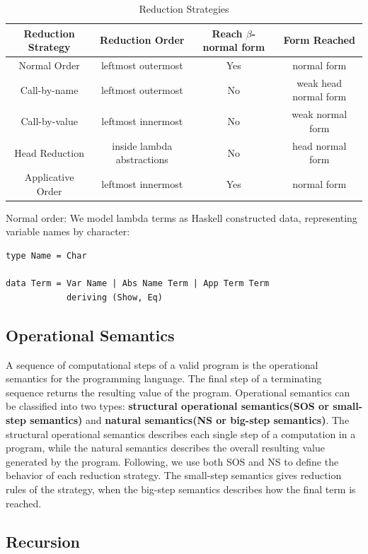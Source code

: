 \documentclass[a4paper,11pt,twoside]{report}
\begin{document}
\begin{center}
\begin{table}[ht!]
\begin{tabular}{|c|c|c|c|}\hline
Reduction Strategy & Reduction Order & Reach $\beta$-normal form & Form Reached\\ \hline
Normal Order & leftmost outermost & Yes & normal form\\ \hline
Call-by-name & leftmost outermost & No  & weak head normal form\\ \hline
Call-by-value & leftmost innermost & No & weak normal form\\ \hline
Head Reduction & inside lambda abstractions & No & head normal form\\ \hline
Applicative Order & leftmost innermost & Yes & normal form\\ \hline
\end{tabular}
\caption{Reduction Strategies}
\end{table}
\end{center}
Normal order:
We model lambda terms as Haskell constructed data, representing variable names by character:

\begin{verbatim}
type Name = Char  

data Term = Var Name | Abs Name Term | App Term Term
            deriving (Show, Eq)
\end{verbatim}


\subsection*{Operational Semantics}

A sequence of computational steps of a valid program is the operational semantics for the programming language. The final step of a terminating sequence returns the resulting value of the program. Operational semantics can be classified into two types: \textbf{structural operational semantics(SOS or small-step semantics)} and \textbf{natural semantics(NS or big-step semantics)}. The structural operational semantics describes each single step of a computation in a program, while the natural semantics describes the overall resulting value generated by the program. Following, we use both SOS and NS to define the behavior of each reduction strategy. The small-step semantics gives reduction rules of the strategy, when the big-step semantics describes how the final term is reached.  

\subsection*{Recursion}
\end{document}
